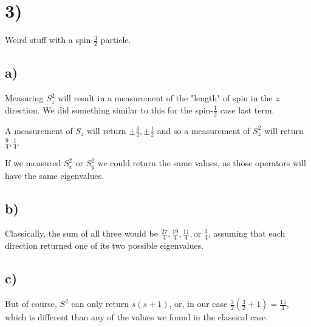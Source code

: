 \documentclass{article}
\begin{document}
\section*{3)}
Weird stuff with a spin-$\frac{3}{2}$ particle.

\subsection*{a)}
Measuring $S_z^2$ will result in a measurement of the "length" of spin in the $z$ direction. We did something similar to this for the spin-$\frac{1}{2}$ case last term.

A measurement of $S_z$ will return $\pm\frac{3}{2},\pm\frac{1}{2}$ and so a measurement of $S_z^2$ will return $\frac{9}{4},\frac{1}{4}$.

If we measured $S_x^2$ or $S_y^2$ we could return the same values, as those operators will have the same eigenvalues.

\subsection*{b)}

Classically, the sum of all three would be $\frac{27}{4},\frac{19}{4},\frac{11}{4},\text{or }\frac{3}{4}$, assuming that each direction returned one of its two possible eigenvalues.


\subsection*{c)}

But of course, $S^2$ can only return $s(s+1)$, or, in our case $\frac{3}{2}(\frac{3}{2}+1)=\frac{15}{4}$, which is different than any of the values we found in the classical case.
\end{document}
